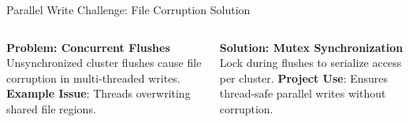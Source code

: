 \documentclass[aspectratio=169]{beamer}
\begin{document}
\begin{frame}{Parallel Write Challenge: File Corruption Solution}
  \begin{columns}
    \textbf{Problem: Concurrent Flushes}
    \small Unsynchronized cluster flushes cause file corruption in multi-threaded writes.
    \vspace{0.5em}
    \textbf{Example Issue}: Threads overwriting shared file regions.

    \textbf{Solution: Mutex Synchronization}
    \small Lock during flushes to serialize access per cluster.
    \vspace{0.5em}
    \vspace{0.5em}
    \textbf{Project Use}: Ensures thread-safe parallel writes without corruption.
  \end{columns}
\end{frame}
\end{document}
